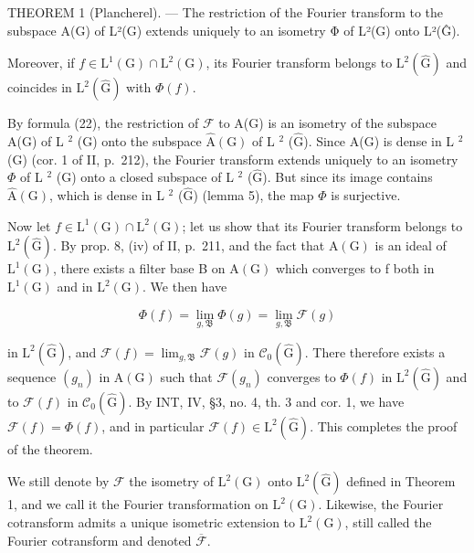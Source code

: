 THEOREM 1 (Plancherel). --- The restriction of the Fourier transform to the subspace A(G) of L²(G) extends uniquely to an isometry Φ of L²(G) onto L²(Ĝ).

Moreover, if \(f \in \mathrm{L}^{1}(\mathrm{G}) \cap \mathrm{L}^{2}(\mathrm{G})\), its Fourier transform belongs to \(\mathrm{L}^{2}(\widehat{\mathrm{G}})\) and coincides in \(\mathrm{L}^{2}(\widehat{\mathrm{G}})\) with \(\Phi(f)\).

By formula (22), the restriction of \(\mathcal{F}\) to A(G) is an isometry of the subspace A(G) of L \(^2\) (G) onto the subspace \(\hat{\mathrm{A}}(\mathrm{G})\) of L \(^2\) (\(\hat{\mathrm{G}}\)). Since A(G) is dense in L \(^2\) (G) (cor. 1 of II, p.~212), the Fourier transform extends uniquely to an isometry \(\Phi\) of L \(^2\) (G) onto a closed subspace of L \(^2\) (\(\hat{\mathrm{G}}\)). But since its image contains \(\hat{\mathrm{A}}(\mathrm{G})\), which is dense in L \(^2\) (\(\hat{\mathrm{G}}\)) (lemma 5), the map \(\Phi\) is surjective.

Now let \(f \in \mathrm{L}^{1}(\mathrm{G}) \cap \mathrm{L}^{2}(\mathrm{G})\); let us show that its Fourier transform belongs to \(\mathrm{L}^{2}(\widehat{\mathrm{G}})\). By prop. 8, (iv) of II, p.~211, and the fact that \(\mathrm{A}(\mathrm{G})\) is an ideal of \(\mathrm{L}^{1}(\mathrm{G})\), there exists a filter base B on \(\mathrm{A}(\mathrm{G})\) which converges to f both in \(\mathrm{L}^{1}(\mathrm{G})\) and in \(\mathrm{L}^{2}(\mathrm{G})\). We then have

\[
\Phi (f) = \lim _ {g, \mathfrak {B}} \Phi (g) = \lim _ {g, \mathfrak {B}} \mathcal {F} (g)
\]

in \(\mathrm{L}^{2}(\widehat{\mathrm{G}})\), and \(\mathcal{F}(f)=\lim_{g,\mathfrak{B}}\mathcal{F}(g)\) in \(\mathcal{C}_{0}(\widehat{\mathrm{G}})\). There therefore exists a sequence \((g_{n})\) in \(\mathrm{A}(\mathrm{G})\) such that \(\mathcal{F}(g_{n})\) converges to \(\Phi(f)\) in \(\mathrm{L}^{2}(\widehat{\mathrm{G}})\) and to \(\mathcal{F}(f)\) in \(\mathcal{C}_{0}(\widehat{\mathrm{G}})\). By INT, IV, §3, no. 4, th. 3 and cor. 1, we have \(\mathcal{F}(f)=\Phi(f)\), and in particular \(\mathcal{F}(f)\in\mathrm{L}^{2}(\widehat{\mathrm{G}})\). This completes the proof of the theorem.

We still denote by \(\mathcal{F}\) the isometry of \(\mathrm{L}^2 (\mathrm{G})\) onto \(\mathrm{L}^2 (\widehat{\mathrm{G}})\) defined in Theorem 1, and we call it the Fourier transformation on \(\mathrm{L}^2 (\mathrm{G})\). Likewise, the Fourier cotransform admits a unique isometric extension to \(\mathrm{L}^2 (\mathrm{G})\), still called the Fourier cotransform and denoted \(\overline{\mathcal{F}}\).

